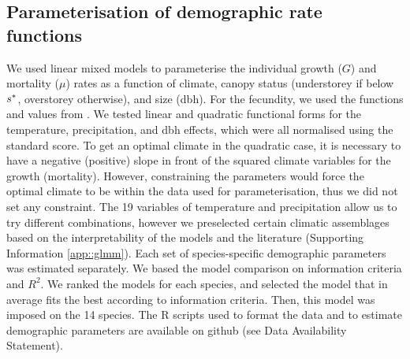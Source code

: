 \subsection{Parameterisation of demographic rate functions}
We used linear mixed models to parameterise the individual growth ($ G $) and mortality ($ \mu $) rates as a function of climate, canopy status (understorey if below $ {s}^{*} $, overstorey otherwise), and size (dbh). For the fecundity, we used the functions and values from \citet{Purves2008}. We tested linear and quadratic functional forms for the temperature, precipitation, and dbh effects, which were all normalised using the standard score. To get an optimal climate in the quadratic case, it is necessary to have a negative (positive) slope in front of the squared climate variables for the growth (mortality). However, constraining the parameters would force the optimal climate to be within the data used for parameterisation, thus we did not set any constraint. The 19 variables of temperature and precipitation allow us to try different combinations, however we preselected certain climatic assemblages based on the interpretability of the models and the literature (Supporting Information \ref{app::glmm}). Each set of species-specific demographic parameters was estimated separately. We based the model comparison on information criteria and $ R^2 $. We ranked the models for each species, and selected the model that in average fits the best according to information criteria. Then, this model was imposed on the 14 species. The R scripts used to format the data and to estimate demographic parameters are available on github (see Data Availability Statement). 

